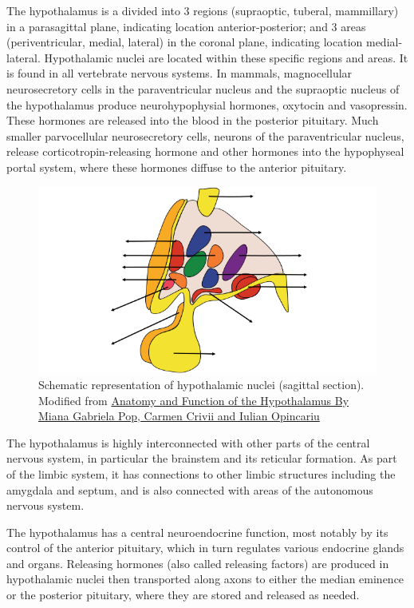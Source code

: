 The hypothalamus is a divided into 3 regions (supraoptic, tuberal, mammillary) in a parasagittal plane, indicating location anterior-posterior; and 3 areas (periventricular, medial, lateral) in the coronal plane, indicating location medial-lateral. Hypothalamic nuclei are located within these specific regions and areas. It is found in all vertebrate nervous systems. In mammals, magnocellular neurosecretory cells in the paraventricular nucleus and the supraoptic nucleus of the hypothalamus produce neurohypophysial hormones, oxytocin and vasopressin. These hormones are released into the blood in the posterior pituitary. Much smaller parvocellular neurosecretory cells, neurons of the paraventricular nucleus, release corticotropin-releasing hormone and other hormones into the hypophyseal portal system, where these hormones diffuse to the anterior pituitary.



\begin{figure}

{\centering \includegraphics[width=0.7\linewidth]{./figures/cns/Hypothalamus} 

}

\caption{Schematic representation of hypothalamic nuclei (sagittal section). Modified from \href{https://www.intechopen.com/books/hypothalamus-in-health-and-diseases/anatomy-and-function-of-the-hypothalamus}{Anatomy and Function of the Hypothalamus By Miana Gabriela Pop, Carmen Crivii and Iulian Opincariu}}\label{fig:hypothalamus}
\end{figure}

The hypothalamus is highly interconnected with other parts of the central nervous system, in particular the brainstem and its reticular formation. As part of the limbic system, it has connections to other limbic structures including the amygdala and septum, and is also connected with areas of the autonomous nervous system.

The hypothalamus has a central neuroendocrine function, most notably by its control of the anterior pituitary, which in turn regulates various endocrine glands and organs. Releasing hormones (also called releasing factors) are produced in hypothalamic nuclei then transported along axons to either the median eminence or the posterior pituitary, where they are stored and released as needed.

